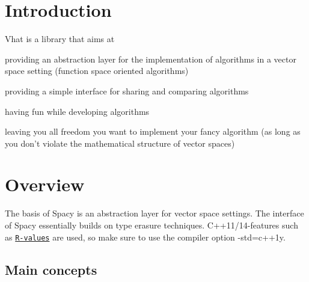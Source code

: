 \hypertarget{index_sec_intro}{}\section{Introduction}\label{index_sec_intro}
Vhat is a library that aims at
\begin{DoxyItemize}
\item providing an abstraction layer for the implementation of algorithms in a vector space setting (function space oriented algorithms)
\item providing a simple interface for sharing and comparing algorithms
\item having fun while developing algorithms
\item leaving you all freedom you want to implement your fancy algorithm (as long as you don't violate the mathematical structure of vector spaces)
\end{DoxyItemize}\hypertarget{index_sec_overview}{}\section{Overview}\label{index_sec_overview}
The basis of Spacy is an abstraction layer for vector space settings. The interface of Spacy essentially builds on type erasure techniques. C++11/14-\/features such as \href{http://en.cppreference.com/w/cpp/language/value_category}{\tt R-\/values} are used, so make sure to use the compiler option -\/std=c++1y.\hypertarget{index_sub_concepts}{}\subsection{Main concepts}\label{index_sub_concepts}

